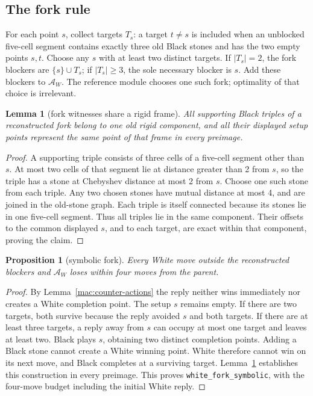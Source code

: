 \documentclass[11pt]{article}
\newtheorem{lemma}[theorem]{Lemma}
\newtheorem{proposition}[theorem]{Proposition}
\theoremstyle{definition}
\theoremstyle{remark}
\begin{document}
\subsection{The fork rule}

For each point \(s\), collect targets \(T_s\): a target \(t\ne s\) is included when an unblocked five-cell segment contains exactly three old Black stones and has the two empty points \(s,t\). Choose any \(s\) with at least two distinct targets. If \(|T_s|=2\), the fork blockers are \(\{s\}\cup T_s\); if \(|T_s|\ge3\), the sole necessary blocker is \(s\). Add these blockers to \(\mathcal A_W\). The reference module chooses one such fork; optimality of that choice is irrelevant.

\begin{lemma}[fork witnesses share a rigid frame]\label{mac:fork-frame}
All supporting Black triples of a reconstructed fork belong to one old rigid component, and all their displayed setup points represent the same point of that frame in every preimage.

\end{lemma}
\begin{proof}
A supporting triple consists of three cells of a five-cell segment other than \(s\). At most two cells of that segment lie at distance greater than 2 from \(s\), so the triple has a stone at Chebyshev distance at most 2 from \(s\). Choose one such stone from each triple. Any two chosen stones have mutual distance at most 4, and are joined in the old-stone graph. Each triple is itself connected because its stones lie in one five-cell segment. Thus all triples lie in the same component. Their offsets to the common displayed \(s\), and to each target, are exact within that component, proving the claim. 
\end{proof}

\begin{proposition}[symbolic fork]\label{mac:fork}
Every White move outside the reconstructed blockers and \(\mathcal A_W\) loses within four moves from the parent.

\end{proposition}
\begin{proof}
By Lemma~\ref{mac:counter-actions} the reply neither wins immediately nor creates a White completion point. The setup \(s\) remains empty. If there are two targets, both survive because the reply avoided \(s\) and both targets. If there are at least three targets, a reply away from \(s\) can occupy at most one target and leaves at least two. Black plays \(s\), obtaining two distinct completion points. Adding a Black stone cannot create a White winning point. White therefore cannot win on its next move, and Black completes at a surviving target. Lemma~\ref{mac:fork-frame} establishes this construction in every preimage. This proves \texttt{white\_fork\_symbolic}, with the four-move budget including the initial White reply. 
\end{proof}
\end{document}
